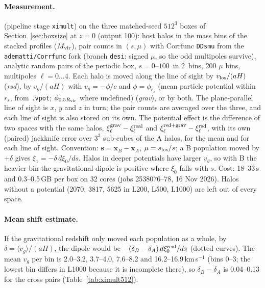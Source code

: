 
\paragraph{Measurement.}  (pipeline stage \texttt{ximult}) on the
three matched-seed $512^3$ boxes of Section~\ref{sec:boxsize} at $z = 0$ (output 100): host halos in the mass bins of
the stacked profiles ($M_{\rm vir}$), pair counts in $(s, \mu)$ with Corrfunc \texttt{DDsmu} from the
\texttt{adematti/Corrfunc} fork (branch \texttt{desi}: signed $\mu$, so the odd multipoles survive), analytic random
pairs of the periodic box, $s = 0$--$100$\,\Mpch{} in 2\,\Mpch{} bins, 200 $\mu$ bins, multipoles $\ell = 0\ldots4$.
Each halo is moved along the line of sight by $v_{\rm los}/(aH)$ (\emph{rsd}), by $v_g/(aH)$ with $v_g = -\phi/c$
and $\phi = \phi_{r_s}$ (mean particle potential within $r_s$, from \texttt{.vpot}; $\phi_{0.5R_{\rm vir}}$ where
undefined) (\emph{grav}), or by both. The plane-parallel line of sight is $x$, $y$ and $z$ in turn; the pair counts
are averaged over the three, and each line of sight is also stored on its own. The potential effect is the difference
of two spaces with the same halos, $\xi_\ell^{\rm grav}-\xi_\ell^{\rm real}$ and $\xi_\ell^{\rm rsd+grav}-\xi_\ell^{\rm
rsd}$, with its own (paired) jackknife error over $3^3$ sub-cubes of the A halos, for the mean and for each line of
sight. Convention: $\mathbf s = \mathbf x_B - \mathbf x_A$, $\mu = s_{\rm los}/s$; a B population moved by $+\delta$
gives $\xi_1 = -\delta\, d\xi_0/ds$. Halos in deeper potentials have larger $v_g$, so with B the heavier bin the
gravitational dipole is positive where $\xi_0$ falls with $s$. Cost: 18--33\,s and 0.3--0.5\,GB per box on 32 cores
(jobs 2538076--78, 16 Nov 2026). Halos without a potential (2070, 3817, 5625 in L200, L500, L1000) are left out of
every space.

\paragraph{Mean shift estimate.} If the gravitational redshift only moved each population as a whole, by
$\delta = \langle v_g\rangle/(aH)$, the dipole would be $-(\delta_B-\delta_A)\, d\xi_0^{\rm real}/ds$ (dotted
curves). The mean $v_g$ per bin is 2.0--3.2, 3.7--4.0, 7.6--8.2 and 16.2--16.9\,km\,s$^{-1}$ (bins 0--3; the
lowest bin differs in L1000 because it is incomplete there), so $\delta_B - \delta_A$ is 0.04--0.13\,\Mpch{} for the
cross pairs (Table~\ref{tab:ximult512}).

